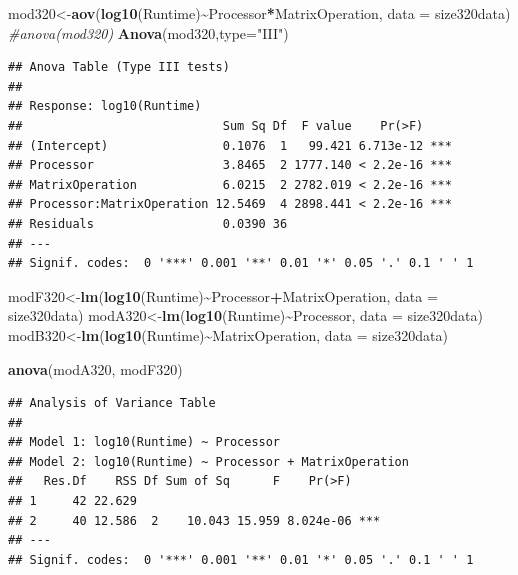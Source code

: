 \documentclass[
]{article}
\newenvironment{Shaded}{\begin{snugshade}}{\end{snugshade}}
\newcommand{\CommentTok}[1]{\textcolor[rgb]{0.56,0.35,0.01}{\textit{#1}}}
\newcommand{\DataTypeTok}[1]{\textcolor[rgb]{0.13,0.29,0.53}{#1}}
\newcommand{\KeywordTok}[1]{\textcolor[rgb]{0.13,0.29,0.53}{\textbf{#1}}}
\newcommand{\NormalTok}[1]{#1}
\newcommand{\OperatorTok}[1]{\textcolor[rgb]{0.81,0.36,0.00}{\textbf{#1}}}
\newcommand{\StringTok}[1]{\textcolor[rgb]{0.31,0.60,0.02}{#1}}
\begin{document}
\begin{Shaded}
\begin{Highlighting}[]
\NormalTok{mod320\textless{}{-}}\KeywordTok{aov}\NormalTok{(}\KeywordTok{log10}\NormalTok{(Runtime)}\OperatorTok{\textasciitilde{}}\NormalTok{Processor}\OperatorTok{*}\NormalTok{MatrixOperation, }\DataTypeTok{data =}\NormalTok{ size320data)}
\CommentTok{\#anova(mod320)}
\KeywordTok{Anova}\NormalTok{(mod320,}\DataTypeTok{type=}\StringTok{"III"}\NormalTok{)}
\end{Highlighting}
\end{Shaded}

\begin{verbatim}
## Anova Table (Type III tests)
## 
## Response: log10(Runtime)
##                            Sum Sq Df  F value    Pr(>F)    
## (Intercept)                0.1076  1   99.421 6.713e-12 ***
## Processor                  3.8465  2 1777.140 < 2.2e-16 ***
## MatrixOperation            6.0215  2 2782.019 < 2.2e-16 ***
## Processor:MatrixOperation 12.5469  4 2898.441 < 2.2e-16 ***
## Residuals                  0.0390 36                       
## ---
## Signif. codes:  0 '***' 0.001 '**' 0.01 '*' 0.05 '.' 0.1 ' ' 1
\end{verbatim}

\begin{Shaded}
\begin{Highlighting}[]
\NormalTok{modF320\textless{}{-}}\KeywordTok{lm}\NormalTok{(}\KeywordTok{log10}\NormalTok{(Runtime)}\OperatorTok{\textasciitilde{}}\NormalTok{Processor}\OperatorTok{+}\NormalTok{MatrixOperation, }\DataTypeTok{data =}\NormalTok{ size320data)}
\NormalTok{modA320\textless{}{-}}\KeywordTok{lm}\NormalTok{(}\KeywordTok{log10}\NormalTok{(Runtime)}\OperatorTok{\textasciitilde{}}\NormalTok{Processor, }\DataTypeTok{data =}\NormalTok{ size320data)}
\NormalTok{modB320\textless{}{-}}\KeywordTok{lm}\NormalTok{(}\KeywordTok{log10}\NormalTok{(Runtime)}\OperatorTok{\textasciitilde{}}\NormalTok{MatrixOperation, }\DataTypeTok{data =}\NormalTok{ size320data)}

\KeywordTok{anova}\NormalTok{(modA320, modF320)}
\end{Highlighting}
\end{Shaded}

\begin{verbatim}
## Analysis of Variance Table
## 
## Model 1: log10(Runtime) ~ Processor
## Model 2: log10(Runtime) ~ Processor + MatrixOperation
##   Res.Df    RSS Df Sum of Sq      F    Pr(>F)    
## 1     42 22.629                                  
## 2     40 12.586  2    10.043 15.959 8.024e-06 ***
## ---
## Signif. codes:  0 '***' 0.001 '**' 0.01 '*' 0.05 '.' 0.1 ' ' 1
\end{verbatim}
\end{document}
